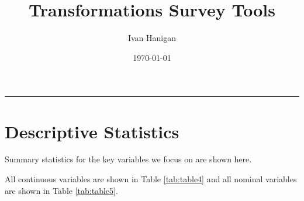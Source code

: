 \documentclass[a4paper]{article}
\title{Transformations Survey Tools}
\author{Ivan Hanigan}
\date{\today}
\begin{document}
\maketitle

\tableofcontents
\hrule

\section{Descriptive Statistics}
\label{sec-1}

Summary statistics for the key variables we focus on are shown here.

All continuous variables are shown in Table \ref{tab:table4} and all nominal variables are shown in Table \ref{tab:table5}.   




\end{document}
